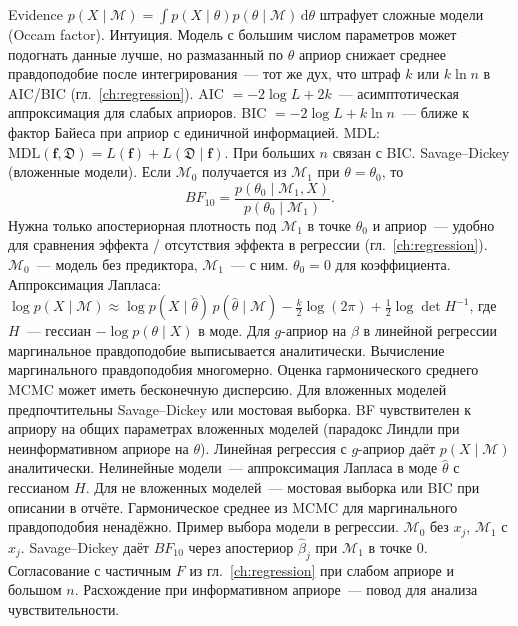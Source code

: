 Evidence $p(X\mid\mathcal{M})=\int p(X\mid\theta)p(\theta\mid\mathcal{M})\,\mathrm{d}\theta$ штрафует сложные модели (Occam factor).
Интуиция. Модель с большим числом параметров может подогнать данные лучше, но размазанный по $\theta$ априор снижает среднее правдоподобие после интегрирования~--- тот же дух, что штраф $k$ или $k\ln n$ в AIC/BIC (гл.~\ref{ch:regression}).
AIC $=-2\log L+2k$~--- асимптотическая аппроксимация для слабых априоров. BIC $=-2\log L+k\ln n$~--- ближе к фактор Байеса при априор с единичной информацией.
MDL: $\mathrm{MDL}(\mathbf{f},\mathfrak{D})=L(\mathbf{f})+L(\mathfrak{D}\mid\mathbf{f})$. При больших $n$ связан с BIC.
Savage--Dickey (вложенные модели). Если $\mathcal{M}_0$ получается из $\mathcal{M}_1$ при $\theta=\theta_0$, то \[ BF_{10}=\frac{p(\theta_0\mid\mathcal{M}_1,X)}{p(\theta_0\mid\mathcal{M}_1)}.
\] Нужна только апостериорная плотность под $\mathcal{M}_1$ в точке $\theta_0$ и априор~--- удобно для сравнения эффекта / отсутствия эффекта в регрессии (гл.~\ref{ch:regression}). $\mathcal{M}_0$~--- модель без предиктора, $\mathcal{M}_1$~--- с ним. $\theta_0=0$ для коэффициента.
Аппроксимация Лапласа: $\log p(X\mid\mathcal{M})\approx \log p(X\mid\hat\theta)\,p(\hat\theta\mid\mathcal{M}) -\frac{k}{2}\log(2\pi)+\frac12\log\det H^{-1}$, где $H$~--- гессиан $-\log p(\theta\mid X)$ в моде.
Для $g$-априор на $\beta$ в линейной регрессии маргинальное правдоподобие выписывается аналитически.
Вычисление маргинального правдоподобия многомерно. Оценка гармонического среднего MCMC может иметь бесконечную дисперсию. Для вложенных моделей предпочтительны Savage--Dickey или мостовая выборка. BF чувствителен к априору на общих параметрах вложенных моделей (парадокс Линдли при неинформативном априоре на $\theta$).
Линейная регрессия с $g$-априор даёт $p(X\mid\mathcal{M})$ аналитически. Нелинейные модели~--- аппроксимация Лапласа в моде $\hat\theta$ с гессианом $H$. Для не вложенных моделей~--- мостовая выборка или BIC при описании в отчёте. Гармоническое среднее из MCMC для маргинального правдоподобия ненадёжно.
Пример выбора модели в регрессии. $\mathcal{M}_0$ без $x_j$, $\mathcal{M}_1$ с $x_j$. Savage--Dickey даёт $BF_{10}$ через апостериор $\hat\beta_j$ при $\mathcal{M}_1$ в точке 0. Согласование с частичным $F$ из гл.~\ref{ch:regression} при слабом априоре и большом $n$. Расхождение при информативном априоре~--- повод для анализа чувствительности.

